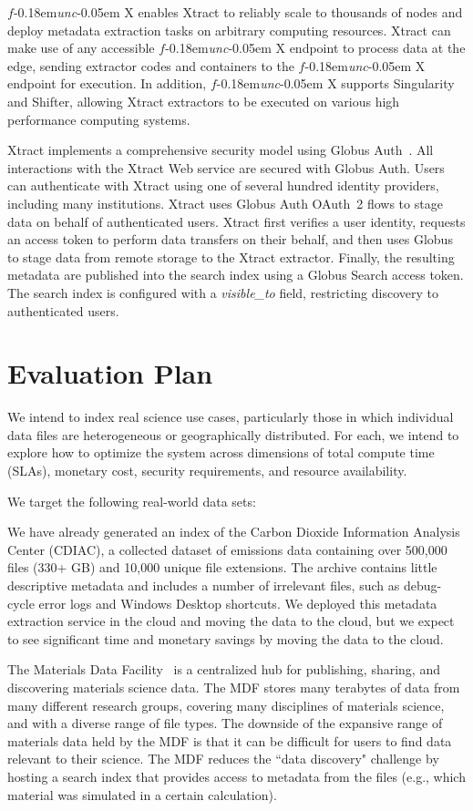 \documentclass[sigconf]{acmart}
\newcommand{\name}{Xtract}
\newcommand{\funcx}{$f$\kern-0.18em\emph{unc}\kern-0.05em X}
\begin{document}
\funcx{} enables \name{} to reliably scale to thousands of nodes and deploy 
metadata extraction tasks on arbitrary computing resources. 
\name{} can make use of any accessible \funcx{} endpoint to process data at the edge, 
sending extractor codes and containers to the \funcx{} endpoint for execution. In addition, 
\funcx{} supports Singularity and Shifter, allowing \name{} extractors to be executed
on various high performance computing systems. 

\name{} implements a comprehensive security model using Globus Auth~\cite{tuecke2016globus}. 
All interactions with the \name{} Web service are secured with Globus Auth. 
Users can authenticate with \name{} using one of 
several hundred identity providers, including many institutions. 
\name{} uses Globus Auth OAuth~2 flows to stage data on behalf
of authenticated users. \name{} first verifies a user identity, requests an access
token to perform data transfers on their behalf, and then uses Globus to stage
data from remote storage to the \name{} extractor. 
Finally, the resulting metadata are published into the search index using a Globus Search
access token. The search index is configured with a \textit{visible\_to} field, restricting
discovery to authenticated users.


\section{Evaluation Plan}
\label{sec:eval}

We intend to index real science use cases, particularly those in which individual data files are heterogeneous 
or geographically distributed. For each, we intend to explore how to optimize the system across dimensions of 
total compute time (SLAs), monetary cost, security requirements, and resource availability.

We target the following real-world data sets: 

We have already generated an index of the Carbon Dioxide Information Analysis Center (CDIAC), a collected dataset of 
emissions data containing over 500,000 files (330+ GB) and 10,000 unique file extensions. The archive contains little 
descriptive metadata and includes a number of irrelevant files, such as debug-cycle error logs and Windows Desktop 
shortcuts.  We deployed this metadata extraction service in the cloud and moving the data to the cloud, but we expect 
to see significant time and monetary savings by moving the data to the cloud.  

The Materials Data Facility~\cite{blaiszik2016materials, blaiszik2019mdf}
is a centralized hub for publishing, sharing, and discovering materials science data. 
The MDF stores many terabytes of data from many different research groups, covering many disciplines of 
materials science, and with a diverse range of file types.
The downside of the expansive range of materials data held by the MDF 
is that it can be difficult for users to find data relevant to their science.
The MDF reduces the ``data discovery" challenge by hosting a search index that provides access to metadata from the 
files (e.g., which material was simulated in a certain calculation).
\end{document}
